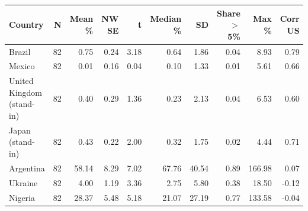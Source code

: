 \begin{tabular}{lrrrrrrrrr}
\hline
Country & N & Mean \% & NW SE & t & Median \% & SD & Share $>$5\% & Max \% & Corr US \\
\hline
Brazil & 82 & 0.75 & 0.24 & 3.18 & 0.64 & 1.86 & 0.04 & 8.93 & 0.79 \\
Mexico & 82 & 0.01 & 0.16 & 0.04 & 0.10 & 1.33 & 0.01 & 5.61 & 0.66 \\
United Kingdom (stand-in) & 82 & 0.40 & 0.29 & 1.36 & 0.23 & 2.13 & 0.04 & 6.53 & 0.60 \\
Japan (stand-in) & 82 & 0.43 & 0.22 & 2.00 & 0.32 & 1.75 & 0.02 & 4.44 & 0.71 \\
Argentina & 82 & 58.14 & 8.29 & 7.02 & 67.76 & 40.54 & 0.89 & 166.98 & 0.07 \\
Ukraine & 82 & 4.00 & 1.19 & 3.36 & 2.75 & 5.80 & 0.38 & 18.50 & -0.12 \\
Nigeria & 82 & 28.37 & 5.48 & 5.18 & 21.07 & 27.19 & 0.77 & 133.58 & -0.04 \\
\hline
\end{tabular}
